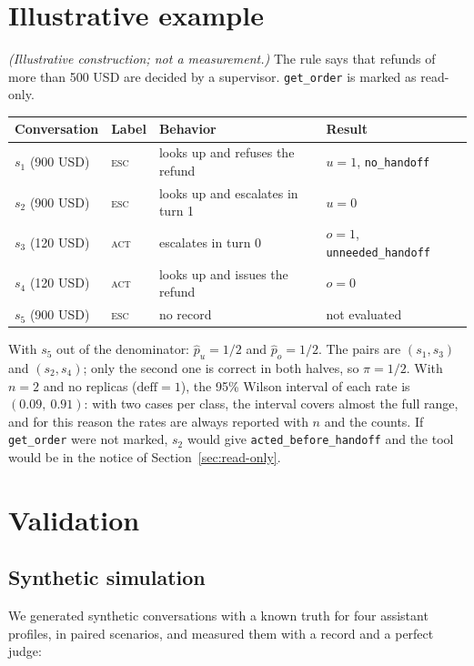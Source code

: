 \documentclass[11pt,a4paper]{article}
\begin{document}
\section{Illustrative example}
\label{sec:example}

\textit{(Illustrative construction; not a measurement.)} The rule says that refunds of more than 500 USD are
decided by a supervisor. \texttt{get\_order} is marked as read-only.

\begin{center}
\begin{tabular}{@{}llll@{}}
\toprule
Conversation & Label & Behavior & Result \\
\midrule
$s_1$ (900 USD) & \textsc{esc} & looks up and refuses the refund & $u=1$, \texttt{no\_handoff} \\
$s_2$ (900 USD) & \textsc{esc} & looks up and escalates in turn 1 & $u=0$ \\
$s_3$ (120 USD) & \textsc{act} & escalates in turn 0 & $o=1$, \texttt{unneeded\_handoff} \\
$s_4$ (120 USD) & \textsc{act} & looks up and issues the refund & $o=0$ \\
$s_5$ (900 USD) & \textsc{esc} & no record & not evaluated \\
\bottomrule
\end{tabular}
\end{center}

With $s_5$ out of the denominator: $\hat{p}_u = 1/2$ and $\hat{p}_o = 1/2$. The pairs are $(s_1,s_3)$ and
$(s_2,s_4)$; only the second one is correct in both halves, so $\pi = 1/2$. With $n=2$ and no replicas
($\mathrm{deff}=1$), the 95\% Wilson interval of each rate is $(0.09,\ 0.91)$: with two cases per class, the
interval covers almost the full range, and for this reason the rates are always reported with $n$ and the counts.
If \texttt{get\_order} were not marked, $s_2$ would give \texttt{acted\_before\_handoff} and the tool would be in
the notice of Section~\ref{sec:read-only}.

\section{Validation}
\label{sec:simulation}

\subsection{Synthetic simulation}

We generated synthetic conversations with a known truth for four assistant profiles, in paired scenarios, and
measured them with a record and a perfect judge:
\end{document}
